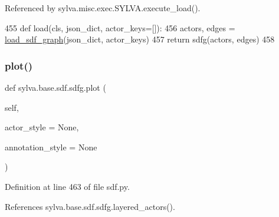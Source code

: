 Referenced by sylva.\+misc.\+exec.\+S\+Y\+L\+V\+A.\+execute\+\_\+load().


\begin{DoxyCode}
455         \textcolor{keyword}{def }load(cls, json\_dict, actor\_keys=[]):
456             actors, edges = \hyperlink{namespacesylva_1_1base_1_1sdf_a0bdfa7a81bf9648662631113a609062d}{load\_sdf\_graph}(json\_dict, actor\_keys)
457             \textcolor{keywordflow}{return} sdfg(actors, edges)
458 
\end{DoxyCode}
\mbox{\label{classsylva_1_1base_1_1sdf_1_1sdfg_a0ec53888667270ea6aec60425b2c8742}} 
\subsubsection{\texorpdfstring{plot()}{plot()}}
{\footnotesize\ttfamily def sylva.\+base.\+sdf.\+sdfg.\+plot (\begin{DoxyParamCaption}\item[{}]{self,  }\item[{}]{actor\+\_\+style = {\ttfamily None},  }\item[{}]{annotation\+\_\+style = {\ttfamily None} }\end{DoxyParamCaption})}



Definition at line 463 of file sdf.\+py.



References sylva.\+base.\+sdf.\+sdfg.\+layered\+\_\+actors().


